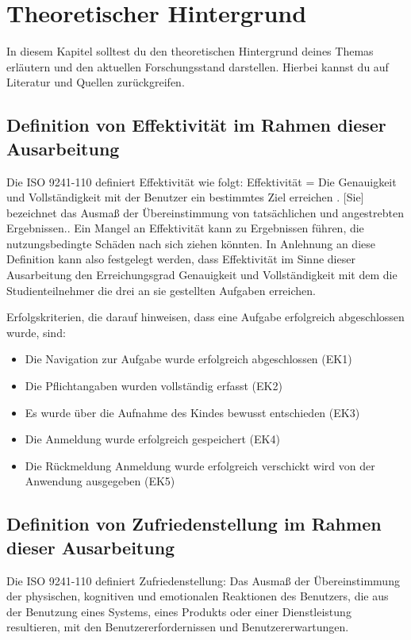 \section{Theoretischer Hintergrund}
In diesem Kapitel solltest du den theoretischen Hintergrund deines Themas erläutern und den aktuellen Forschungsstand darstellen. Hierbei kannst du auf Literatur und Quellen zurückgreifen.

\subsection{Definition von Effektivität im Rahmen dieser Ausarbeitung }
Die ISO 9241-110 definiert Effektivität wie folgt: \glqq Effektivität = Die Genauigkeit und Vollständigkeit mit der Benutzer ein bestimmtes Ziel erreichen\grqq{} \cite{ISO-9241-110}. 
\grqq{}[Sie] bezeichnet das Ausmaß der Übereinstimmung von tatsächlichen und angestrebten Ergebnissen.\glqq \cite{iso-9241-11}. Ein \glqq Mangel an Effektivität kann zu Ergebnissen führen, die nutzungsbedingte Schäden nach sich ziehen könnten.\glqq \cite{iso-9241-11}
In Anlehnung an diese Definition kann also festgelegt werden, dass Effektivität im Sinne dieser Ausarbeitung den Erreichungsgrad Genauigkeit und Vollständigkeit mit dem die Studienteilnehmer die drei an sie gestellten Aufgaben erreichen. 

Erfolgskriterien, die darauf hinweisen, dass eine Aufgabe erfolgreich abgeschlossen wurde, sind: 
\begin{itemize}
    \item Die Navigation zur Aufgabe wurde erfolgreich abgeschlossen (EK1)
    \item Die Pflichtangaben wurden vollständig erfasst (EK2)
    \item Es wurde über die Aufnahme des Kindes bewusst entschieden (EK3)
    \item Die Anmeldung wurde erfolgreich gespeichert (EK4)
    \item Die Rückmeldung \glqq Anmeldung wurde erfolgreich verschickt\grqq{} wird von der Anwendung ausgegeben (EK5)
\end{itemize}

\subsection{Definition von Zufriedenstellung im Rahmen dieser Ausarbeitung}
Die ISO 9241-110 definiert Zufriedenstellung: \glqq Das Ausmaß der Übereinstimmung der physischen, kognitiven und emotionalen Reaktionen des Benutzers, die aus der Benutzung eines Systems, eines Produkts oder einer Dienstleistung resultieren, mit den Benutzererfordernissen und Benutzererwartungen.\glqq \cite{ISO-9241-110} 

